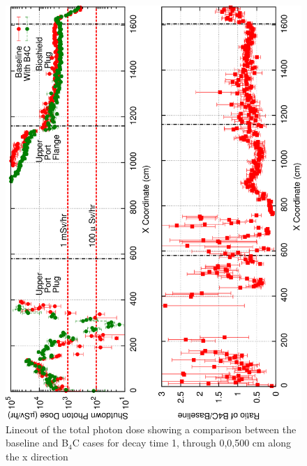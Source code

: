 \documentclass[12pt]{article}
\begin{document}
\begin{figure}[ht!]
\centering
\includegraphics[angle=-90,clip,scale=0.15]{../plots/photon_lineout/dc1_z500_lineout.png}
\caption{Lineout of the total photon dose showing a comparison between the baseline and B$_4$C cases for decay time 1,
                 through 0,0,500 cm along the x direction}
\label{fig:photons_dc1_total_dose_lineout_z500}
\end{figure}
\end{document}
